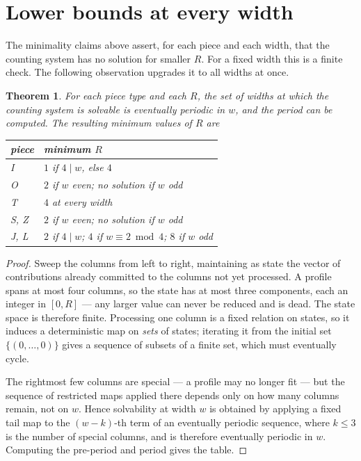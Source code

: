 \documentclass[11pt,a4paper]{article}
\theoremstyle{plain}
\newtheorem{theorem}{Theorem}
\theoremstyle{definition}
\theoremstyle{remark}
\begin{document}
\section{Lower bounds at every width}
\label{sec:lower}

The minimality claims above assert, for each piece and each width, that the counting
system has no solution for smaller $R$. For a fixed width this is a finite check. The
following observation upgrades it to all widths at once.

\begin{theorem}
\label{thm:lower}
For each piece type and each $R$, the set of widths at which the counting system is
solvable is eventually periodic in $w$, and the period can be computed. The resulting
minimum values of $R$ are
\begin{center}
\begin{tabular}{ll}
\toprule
piece & minimum $R$ \\
\midrule
I & $1$ if $4 \mid w$, else $4$ \\
O & $2$ if $w$ even; no solution if $w$ odd \\
T & $4$ at every width \\
S, Z & $2$ if $w$ even; no solution if $w$ odd \\
J, L & $2$ if $4 \mid w$; $4$ if $w \equiv 2 \bmod 4$; $8$ if $w$ odd \\
\bottomrule
\end{tabular}
\end{center}
\end{theorem}

\begin{proof}
Sweep the columns from left to right, maintaining as state the vector of
contributions already committed to the columns not yet processed. A profile spans at
most four columns, so the state has at most three components, each an integer in
$[0,R]$ --- any larger value can never be reduced and is dead. The state space is
therefore finite. Processing one column is a fixed relation on states, so it induces
a deterministic map on \emph{sets} of states; iterating it from the initial set
$\{(0,\dots,0)\}$ gives a sequence of subsets of a finite set, which must eventually
cycle.

The rightmost few columns are special --- a profile may no longer fit --- but the
sequence of restricted maps applied there depends only on how many columns remain,
not on $w$. Hence solvability at width $w$ is obtained by applying a fixed tail map
to the $(w - k)$-th term of an eventually periodic sequence, where $k \leq 3$ is the
number of special columns, and is therefore eventually periodic in $w$. Computing the
pre-period and period gives the table. \qedhere
\end{proof}
\end{document}
